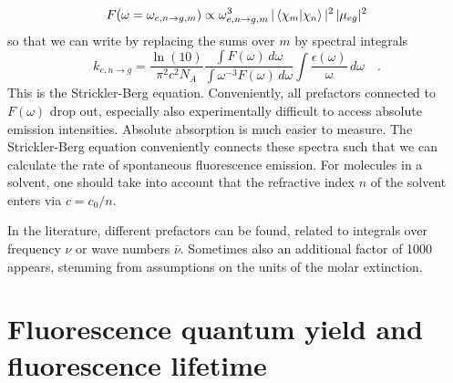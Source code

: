 \begin{equation}
 F(\omega =  \omega_{e,n \rightarrow g,m} )  \propto  \omega_{e,n \rightarrow g,m}^3 \,  | \braket{\chi_m |  \chi_n} |^2 \, | \mu_{eg} |^2
\end{equation}
so that we can write by replacing the sums over $m$ by  spectral integrals
\begin{equation}
 k_{e,n \rightarrow g}  =  \frac{\ln(10)}{\pi^2 c^2 N_A} \frac{\int F(\omega) \, d \omega}{\int \omega^{-3} F(\omega) \, d \omega }
 \int \frac{\epsilon(\omega)}{\omega} \, d \omega   \quad. 
\end{equation}
This is the Strickler-Berg equation. Conveniently, all prefactors connected to $F(\omega)$ drop out, especially also experimentally difficult to access absolute emission intensities. Absolute absorption is much  easier to measure. The Strickler-Berg equation conveniently connects these spectra such that we can calculate the rate of spontaneous fluorescence emission. For molecules in a solvent, one should take into account that the refractive index $n$ of the solvent enters via $c = c_0 / n$. 

In the literature, different prefactors can be found, related to integrals over frequency $\nu$ or wave numbers $\bar{\nu}$. Sometimes also an additional factor of 1000 appears, stemming from assumptions on the units of the molar extinction.














\section{Fluorescence quantum yield and fluorescence lifetime} 





